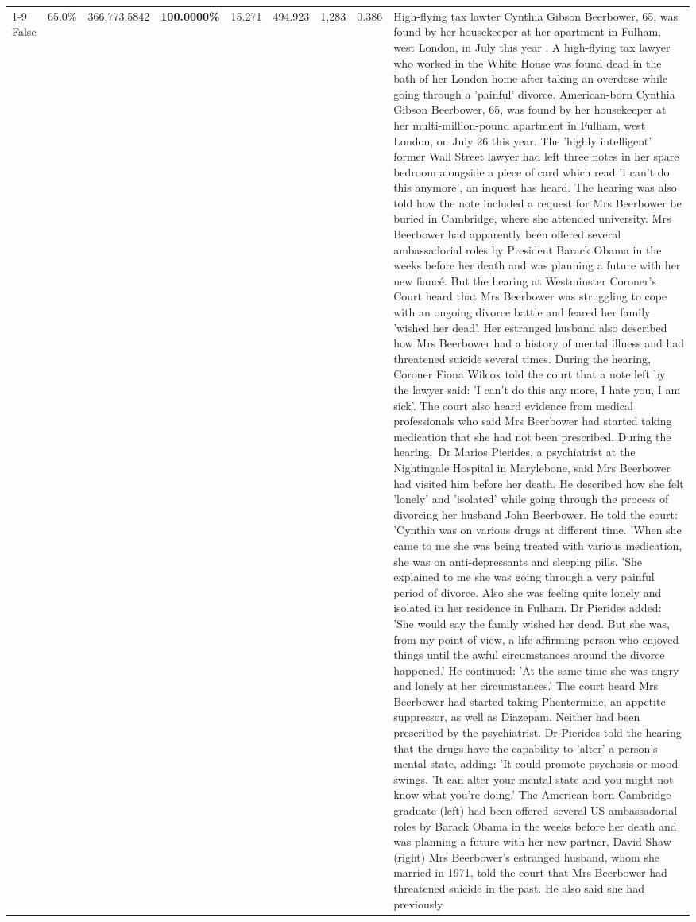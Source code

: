 \begin{table}[H]
\begin{tabular}{lllrlllll}
\cline{1-9}
False & 65.0\% & 366,773.5842 & \bfseries \color{red} 100.0000\% & 15.271 & 494.923 & 1,283 & 0.386 & High-flying tax lawter Cynthia Gibson Beerbower, 65, was found by her housekeeper at her apartment in Fulham, west London, in July this year . A high-flying tax lawyer who worked in the White House was found dead in the bath of her London home after taking an overdose while going through a 'painful' divorce. American-born Cynthia Gibson Beerbower, 65, was found by her housekeeper at her multi-million-pound apartment in Fulham, west London, on July 26 this year. The 'highly intelligent' former Wall Street lawyer had left three notes in her spare bedroom alongside a piece of card which read 'I can't do this anymore', an inquest has heard. The hearing was also told how the note included a request for Mrs Beerbower be buried in Cambridge, where she attended university. Mrs Beerbower had apparently been offered several ambassadorial roles by President Barack Obama in the weeks before her death and was planning a future with her new fiancé. But the hearing at Westminster Coroner's Court heard that Mrs Beerbower was struggling to cope with an ongoing divorce battle and feared her family 'wished her dead'. Her estranged husband also described how Mrs Beerbower had a history of mental illness and had threatened suicide several times. During the hearing, Coroner Fiona Wilcox told the court that a note left by the lawyer said: 'I can't do this any more, I hate you, I am sick'. The court also heard evidence from medical professionals who said Mrs Beerbower had started taking medication that she had not been prescribed. During the hearing, Dr Marios Pierides, a psychiatrist at the Nightingale Hospital in Marylebone, said Mrs Beerbower had visited him before her death. He described how she felt 'lonely' and 'isolated' while going through the process of divorcing her husband John Beerbower. He told the court: 'Cynthia was on various drugs at different time. 'When she came to me she was being treated with various medication, she was on anti-depressants and sleeping pills. 'She explained to me she was going through a very painful period of divorce. Also she was feeling quite lonely and isolated in her residence in Fulham. Dr Pierides added: 'She would say the family wished her dead. But she was, from my point of view, a life affirming person who enjoyed things until the awful circumstances around the divorce happened.' He continued: 'At the same time she was angry and lonely at her circumstances.' The court heard Mrs Beerbower had started taking Phentermine, an appetite suppressor, as well as Diazepam. Neither had been prescribed by the psychiatrist. Dr Pierides told the hearing that the drugs have the capability to 'alter' a person's mental state, adding: 'It could promote psychosis or mood swings. 'It can alter your mental state and you might not know what you're doing.' The American-born Cambridge graduate (left) had been offered several US ambassadorial roles by Barack Obama in the weeks before her death and was planning a future with her new partner, David Shaw (right) Mrs Beerbower's estranged husband, whom she married in 1971, told the court that Mrs Beerbower had threatened suicide in the past. He also said she had previously 
\end{tabular}
\end{table}
